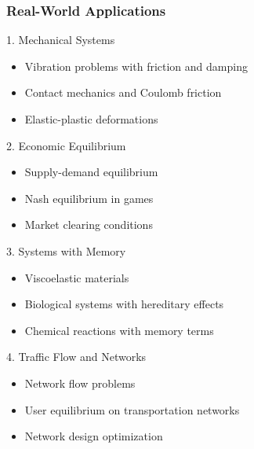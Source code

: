 \documentclass[aspectratio=169,10pt]{beamer}
\begin{document}
\begin{frame}[allowframebreaks]
    \frametitle{Real-World Applications}

    \begin{block}{1. Mechanical Systems}
        \begin{itemize}
            \item Vibration problems with friction and damping
            \item Contact mechanics and Coulomb friction
            \item Elastic-plastic deformations
        \end{itemize}
    \end{block}

    \begin{block}{2. Economic Equilibrium}
        \begin{itemize}
            \item Supply-demand equilibrium
            \item Nash equilibrium in games
            \item Market clearing conditions
        \end{itemize}
    \end{block}

    \framebreak

    \begin{block}{3. Systems with Memory}
        \begin{itemize}
            \item Viscoelastic materials
            \item Biological systems with hereditary effects
            \item Chemical reactions with memory terms
        \end{itemize}
    \end{block}

    \begin{block}{4. Traffic Flow and Networks}
        \begin{itemize}
            \item Network flow problems
            \item User equilibrium on transportation networks
            \item Network design optimization
        \end{itemize}
    \end{block}
\end{frame}
\end{document}

